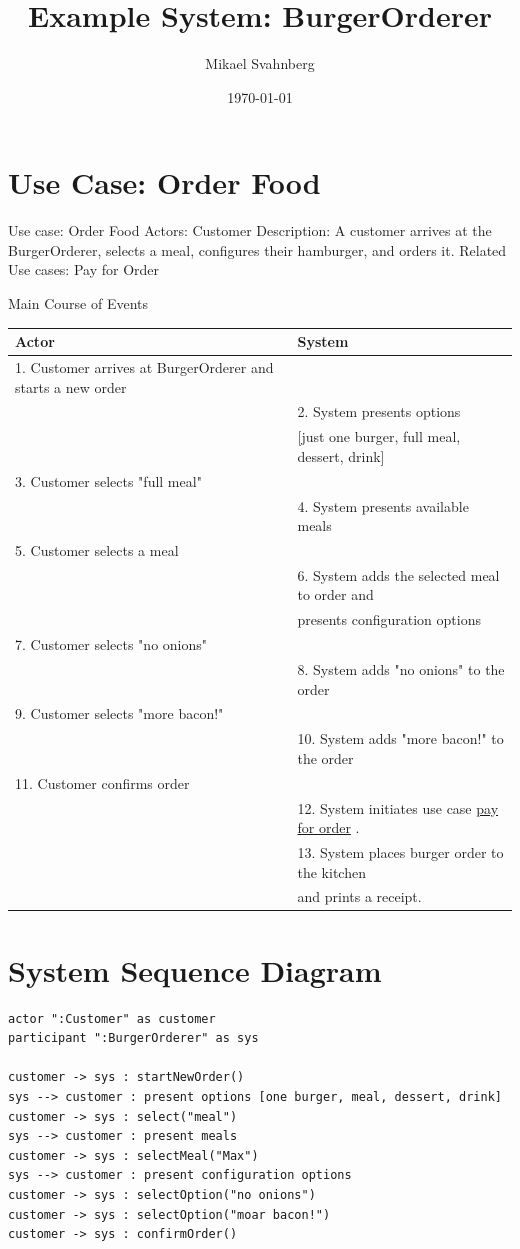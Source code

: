 \documentclass[11pt]{article}
\author{Mikael Svahnberg}
\date{\today}
\title{Example System: BurgerOrderer}
\begin{document}
\maketitle
\tableofcontents

\section{Use Case: Order Food}
\label{sec:org08000b8}
Use case: Order Food
Actors: Customer
Description: A customer arrives at the BurgerOrderer, selects a meal, configures their hamburger, and orders it.
Related Use cases: Pay for Order

Main Course of Events
\begin{center}
\begin{tabular}{ll}
Actor & System\\
\hline
1. Customer arrives at BurgerOrderer and starts a new order & \\
 & 2. System presents options\\
 & [just one burger, full meal, dessert, drink]\\
3. Customer selects "full meal" & \\
 & 4. System presents available meals\\
5. Customer selects a meal & \\
 & 6. System adds the selected meal to order and\\
 & presents configuration options\\
7. Customer selects "no onions" & \\
 & 8. System adds "no onions" to the order\\
9. Customer selects "more bacon!" & \\
 & 10. System adds "more bacon!" to the order\\
11. Customer confirms order & \\
 & 12. System initiates use case \uline{pay for order} .\\
 & 13. System places burger order to the kitchen\\
 & and prints a receipt.\\
\hline
\end{tabular}
\end{center}
\section{System Sequence Diagram}
\label{sec:org7c97468}
\begin{verbatim}
actor ":Customer" as customer
participant ":BurgerOrderer" as sys

customer -> sys : startNewOrder()
sys --> customer : present options [one burger, meal, dessert, drink]
customer -> sys : select("meal")
sys --> customer : present meals
customer -> sys : selectMeal("Max")
sys --> customer : present configuration options
customer -> sys : selectOption("no onions")
customer -> sys : selectOption("moar bacon!")
customer -> sys : confirmOrder()


\end{verbatim}
\end{document}
